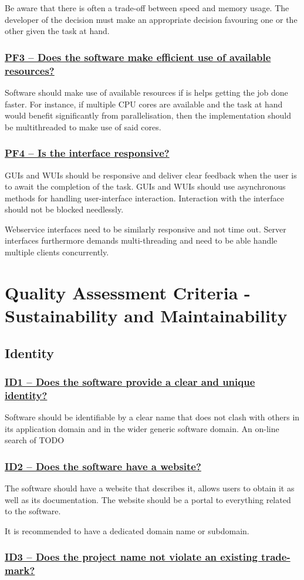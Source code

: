 \documentclass[a4paper,11pt]{article}
\newcommand{\indicator}[1]{\subsubsection*{\underline{#1}}}
\begin{document}
Be aware that there is often a trade-off between speed and memory usage. The
developer of the decision must make an appropriate decision favouring one or the other
given the task at hand. 

\indicator{PF3 -- Does the software make efficient use of available resources?}

Software should make use of available resources if is helps getting the job
done faster. For instance, if multiple CPU cores are available and the task at hand
would benefit significantly from parallelisation, then the implementation should be
multithreaded to make use of said cores.

\indicator{PF4 -- Is the interface responsive?}

GUIs and WUIs should be responsive and deliver clear feedback when the user is
to await the completion of the task. GUIs and WUIs should use asynchronous methods for
handling user-interface interaction. Interaction with the interface should not
be blocked needlessly.

Webservice interfaces need to be similarly responsive and not time out. Server
interfaces furthermore demands multi-threading and need to be able handle
multiple clients concurrently.


\section{Quality Assessment Criteria - Sustainability and Maintainability}

\subsection{Identity}

\indicator{ID1 -- Does the software provide a clear and unique identity?}

Software should be identifiable by a clear name that does not clash with others
in its application domain and in the wider generic software domain. An on-line
search of TODO 

\indicator{ID2 -- Does the software have a website?}

The software should have a website that describes it, allows users to obtain
it as well as its documentation. The website should be a portal to everything
related to the software.

It is recommended to have a dedicated domain name or subdomain.

\indicator{ID3 -- Does the project name not violate an existing trade-mark?}
\end{document}
